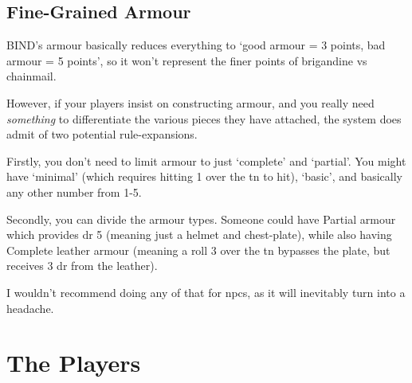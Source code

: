 \begin{multicols}{2}
\subsection{Fine-Grained Armour}

BIND's armour basically reduces everything to `good armour = 3 points, bad armour = 5 points', so it won't represent the finer points of brigandine vs chainmail.

However, if your players insist on constructing armour, and you really need \emph{something} to differentiate the various pieces they have attached, the system does admit of two potential rule-expansions.

Firstly, you don't need to limit armour to just `complete' and `partial'.
You might have `minimal' (which requires hitting 1 over the \gls{tn} to hit), `basic', and basically any other number from 1-5.

Secondly, you can divide the armour types.
Someone could have Partial armour which provides \gls{dr} 5 (meaning just a helmet and chest-plate), while also having Complete leather armour (meaning a roll 3 over the \gls{tn} bypasses the plate, but receives 3 \gls{dr} from the leather).

I wouldn't recommend doing any of that for \glspl{npc}, as it will inevitably turn into a headache.

\end{multicols}

\section{The Players}

